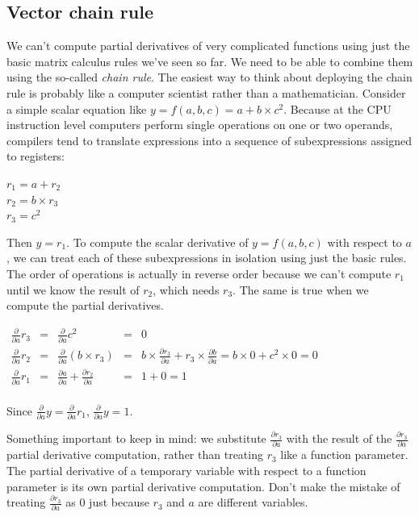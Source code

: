 \documentclass[11pt]{article}
\begin{document}
\subsection{Vector chain rule}

We can't compute partial derivatives of very complicated functions using just the basic matrix calculus rules we've seen so far. We need to be able to combine them using the so-called {\em chain rule}. The easiest way to think about deploying the chain rule is probably like a computer scientist rather than a mathematician. Consider a simple scalar equation like $y = f(a,b,c) = a + b \times c^2$.  Because at the CPU instruction level computers perform single operations on one or two operands, compilers tend to translate expressions into a sequence of subexpressions assigned to registers:

$r_1 = a + r_2$\\
$r_2 = b \times r_3$\\
$r_3 = c^2$

Then $y = r_1$. To compute the scalar derivative of $y = f(a,b,c)$ with respect to $a$, we can treat each of these subexpressions in isolation using just the basic rules.  The order of operations is actually in reverse order because we can't compute $r_1$ until we know the result of $r_2$, which needs $r_3$. The same is true when we compute the partial derivatives.

$
\begin{array}{lllll}
\frac{\partial }{\partial a} r_3 & = & \frac{\partial }{\partial a} c^2 & = & 0\\
\frac{\partial }{\partial a} r_2 & = & \frac{\partial }{\partial a} (b \times r_3) & = & b \times \frac{\partial r_3}{\partial a} + r_3 \times \frac{\partial b}{\partial a} = b \times 0 + c^2 \times 0 = 0\\
\frac{\partial }{\partial a} r_1 & = & \frac{\partial a}{\partial a} + \frac{\partial r_2}{\partial a} & = & 1 + 0 = 1\\
\end{array}
$

Since $\frac{\partial }{\partial a} y = \frac{\partial }{\partial a} r_1$, $\frac{\partial }{\partial a} y = 1$.

Something important to keep in mind: we substitute $\frac{\partial r_3}{\partial a}$ with the result of the $\frac{\partial r_3}{\partial a}$ partial derivative computation, rather than treating $r_3$ like a function parameter.  The partial derivative of a temporary variable with respect to a function parameter is its own partial derivative computation. Don't make the mistake of treating $\frac{\partial r_3}{\partial a}$ as 0 just because $r_3$ and $a$ are different variables.
\end{document}
